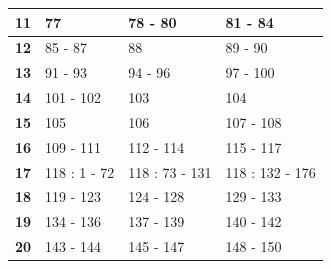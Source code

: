 {\begin{table}[h]
\begin{tabular}{|cccc|}
  \multicolumn{1}{|c|}{\textbf{11}} & \multicolumn{1}{l|}{77} & \multicolumn{1}{l|}{78 - 80} & \multicolumn{1}{l|}{81 - 84} \\ \hline
  \multicolumn{1}{|c|}{\textbf{12}} & \multicolumn{1}{l|}{85 - 87} & \multicolumn{1}{l|}{88} & \multicolumn{1}{l|}{89 - 90} \\ \hline
  \multicolumn{1}{|c|}{\textbf{13}} & \multicolumn{1}{l|}{91 - 93} & \multicolumn{1}{l|}{94 - 96} & \multicolumn{1}{l|}{97 - 100} \\ \hline
  \multicolumn{1}{|c|}{\textbf{14}} & \multicolumn{1}{l|}{101 - 102} & \multicolumn{1}{l|}{103} & \multicolumn{1}{l|}{104} \\ \hline
  \multicolumn{1}{|c|}{\textbf{15}} & \multicolumn{1}{l|}{105} & \multicolumn{1}{l|}{106} & \multicolumn{1}{l|}{107 - 108} \\ \hline
  \multicolumn{1}{|c|}{\textbf{16}} & \multicolumn{1}{l|}{109 - 111} & \multicolumn{1}{l|}{112 - 114} & \multicolumn{1}{l|}{115 - 117} \\ \hline
  \multicolumn{1}{|c|}{\textbf{17}} & \multicolumn{1}{l|}{118 : 1 - 72} & \multicolumn{1}{l|}{118 : 73 - 131} & \multicolumn{1}{l|}{118 : 132 - 176} \\ \hline
  \multicolumn{1}{|c|}{\textbf{18}} & \multicolumn{1}{l|}{119 - 123} & \multicolumn{1}{l|}{124 - 128} & \multicolumn{1}{l|}{129 - 133} \\ \hline
  \multicolumn{1}{|c|}{\textbf{19}} & \multicolumn{1}{l|}{134 - 136} & \multicolumn{1}{l|}{137 - 139} & \multicolumn{1}{l|}{140 - 142} \\ \hline
  \multicolumn{1}{|c|}{\textbf{20}} & \multicolumn{1}{l|}{143 - 144} & \multicolumn{1}{l|}{145 - 147} & \multicolumn{1}{l|}{148 - 150} \\ \hline
  \end{tabular}
  \end{table}
}

\newpage


\begin{center}
\end{center}

